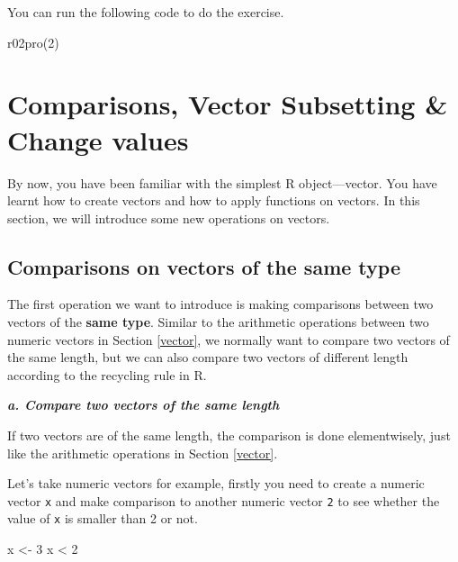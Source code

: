 \documentclass[
]{book}
\newenvironment{Shaded}{\begin{snugshade}}{\end{snugshade}}
\newcommand{\DecValTok}[1]{\textcolor[rgb]{0.00,0.00,0.81}{#1}}
\newcommand{\FunctionTok}[1]{\textcolor[rgb]{0.00,0.00,0.00}{#1}}
\newcommand{\NormalTok}[1]{#1}
\newcommand{\OtherTok}[1]{\textcolor[rgb]{0.56,0.35,0.01}{#1}}
\newcommand{\SpecialCharTok}[1]{\textcolor[rgb]{0.00,0.00,0.00}{#1}}
\begin{document}
You can run the following code to do the exercise.

\begin{Shaded}
\begin{Highlighting}[]
\FunctionTok{r02pro}\NormalTok{(}\DecValTok{2}\NormalTok{)}
\end{Highlighting}
\end{Shaded}

\hypertarget{comparisons-vector-subsetting-change-values-1}{%
\section{Comparisons, Vector Subsetting \& Change values}\label{comparisons-vector-subsetting-change-values-1}}

By now, you have been familiar with the simplest R object---vector. You have learnt how to create vectors and how to apply functions on vectors. In this section, we will introduce some new operations on vectors.

\hypertarget{comparisons-on-vectors-of-the-same-type-1}{%
\subsection{Comparisons on vectors of the same type}\label{comparisons-on-vectors-of-the-same-type-1}}

The first operation we want to introduce is making comparisons between two vectors of the \textbf{same type}. Similar to the arithmetic operations between two numeric vectors in Section \ref{vector}, we normally want to compare two vectors of the same length, but we can also compare two vectors of different length according to the recycling rule in R.

\textbf{\emph{a. Compare two vectors of the same length}}

If two vectors are of the same length, the comparison is done elementwisely, just like the arithmetic operations in Section \ref{vector}.

Let's take numeric vectors for example, firstly you need to create a numeric vector \texttt{x} and make comparison to another numeric vector \texttt{2} to see whether the value of \texttt{x} is smaller than 2 or not.

\begin{Shaded}
\begin{Highlighting}[]
\NormalTok{x }\OtherTok{\textless{}{-}} \DecValTok{3}
\NormalTok{x }\SpecialCharTok{\textless{}} \DecValTok{2}
\end{Highlighting}
\end{Shaded}
\end{document}
